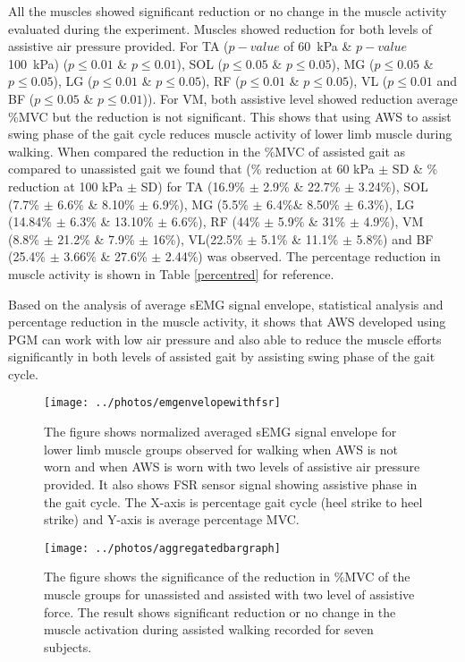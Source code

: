 \documentclass[letterpaper, 10 pt, conference]{ieeeconf}  %
\begin{document}
All the muscles showed significant reduction or no change in the muscle activity evaluated during the experiment. Muscles showed reduction for both levels of assistive air pressure provided. For TA ($p-value$ of \SI{60}{\kilo\pascal} \& $p-value$  \SI{100}{\kilo\pascal}) ($p\le0.01$ \& $p\le0.01$), SOL ($p\le0.05$ \& $p\le0.05$), MG ($p\le0.05$ \& $p\le0.05$), LG ($p\le0.01$ \& $p\le0.05$), RF ($p\le0.01$ \& $p\le0.05$), VL ($p\le0.01$ and BF ($p\le0.05$ \& $p\le0.01$)). For VM, both assistive level showed reduction average \%MVC but the reduction is not significant. This shows that using AWS to assist swing phase of the gait cycle reduces muscle activity of lower limb muscle during walking. When compared the reduction in the \%MVC of assisted gait as compared to unassisted gait we found that (\% reduction at 60 kPa $\pm$ SD \& \% reduction at 100 kPa $\pm$ SD) for TA (16.9\% $\pm$ 2.9\% \& 22.7\% $\pm$ 3.24\%), SOL (7.7\% $\pm$ 6.6\% \& 8.10\% $\pm$ 6.9\%), MG (5.5\% $\pm$ 6.4\%\& 8.50\% $\pm$ 6.3\%), LG (14.84\% $\pm$ 6.3\% \& 13.10\% $\pm$ 6.6\%), RF (44\% $\pm$ 5.9\% \& 31\% $\pm$ 4.9\%), VM (8.8\% $\pm$ 21.2\% \& 7.9\% $\pm$ 16\%), VL(22.5\% $\pm$ 5.1\% \& 11.1\% $\pm$ 5.8\%) and BF (25.4\% $\pm$ 3.66\% \& 27.6\% $\pm$ 2.44\%) was observed. The percentage reduction in muscle activity is shown in Table \ref{percentred} for reference. 

Based on the analysis of average sEMG signal envelope, statistical analysis and percentage reduction in the muscle activity, it shows that AWS developed using PGM can work with low air pressure and also able to reduce the muscle efforts significantly in both levels of assisted gait by assisting swing phase of the gait cycle. 

\begin{figure*}
	\centering
	\texttt{[image: ../photos/emgenvelopewithfsr]}
	\caption{The figure shows normalized averaged sEMG signal envelope for lower limb muscle groups observed for walking when AWS is not worn and when AWS is worn with two levels of assistive air pressure provided. It also shows FSR sensor signal showing assistive phase in the gait cycle. The X-axis is percentage gait cycle (heel strike to heel strike) and Y-axis is average percentage MVC.}
	\label{fig:emgenvelope}
\end{figure*}

\begin{figure*}
	\centering
	\texttt{[image: ../photos/aggregatedbargraph]}
	\caption{The figure shows the significance of the reduction in \%MVC of the muscle groups for unassisted and assisted with two level of assistive force. The result shows significant reduction or no change in the muscle activation during assisted walking recorded for seven subjects.}
	\label{fig:aggregatedbargraph}
\end{figure*}
\end{document}
